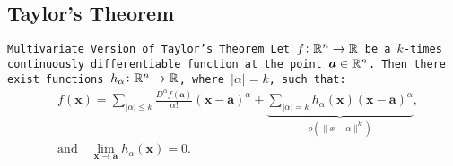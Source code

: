 \documentclass[11pt,a4paper]{article}
\begin{document}
	\subsection{Taylor's Theorem}
	\tt{Multivariate Version of Taylor's Theorem}
	Let $f \colon \mathbb{R}^n \to \mathbb{R}$ be a $k$-times continuously differentiable 
	function at the point $\boldsymbol{a} \in \mathbb{R}^n$. Then there exist functions 
	$h_\alpha \colon \mathbb{R}^n \to \mathbb{R}$, where $|\alpha| = k$, such that:
	\[
		{\begin{aligned}&f({\boldsymbol {x}})=\sum _{|\alpha |\leq k}{\frac 
		{D^{\alpha }f({\boldsymbol {a}})}{\alpha !}}({\boldsymbol {x}}-
		{\boldsymbol 
		{a}})^{\alpha }+\underbrace{\sum _{|\alpha |=k}h_{\alpha }({\boldsymbol 
		{x}})({\boldsymbol {x}}-{\boldsymbol {a}})^{\alpha }}_{o(\|x-\alpha\|
		^k)},\\&{\mbox{and}}\quad \lim _{{\boldsymbol {x}}\to {\boldsymbol {a}}}
		h_{\alpha }({\boldsymbol {x}})=0.\end{aligned}}
	\]
	
	\newpage
	
\end{document}
